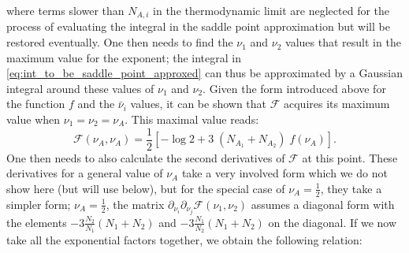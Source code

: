 \documentclass[aps,pra,reprint,superscriptaddress,twocolumn,notitlepage]{revtex4-1}
\numberwithin{equation}{section}
\begin{document}
where terms slower than $N_{A,i}$ in the thermodynamic limit are neglected for the process of evaluating the integral in the saddle point approximation but will be restored eventually.
One then needs to find the $\nu_1$ and $\nu_2$ values that result in the maximum value for the exponent; the integral in \eqref{eq:int_to_be_saddle_point_approxed} can thus be approximated by a Gaussian integral around these values of $\nu_1$ and $\nu_2$. Given the form introduced above for the function $f$ and the $\bar{\nu}_i$ values, it can be shown that $\mathcal{F}$ acquires its maximum value when $\nu_1 = \nu_2 = \nu_A$. This maximal value reads:
\begin{equation}
    \mathcal{F}(\nu_A, \nu_A) = \frac{1}{2} \left[ -\log 2 +  3 \; (N_{A_1}+N_{A_2}) \; f(\nu_A)    \right].
\end{equation}
One then needs to also calculate the second derivatives of $\mathcal{F}$ at this point. These derivatives for a general value of $\nu_A$ take a very involved form which we do not show here (but will use below), but for the special case of $\nu_A = \frac12$, they take a simpler form; $\nu_A = \frac12$, the matrix $\partial_{\nu_i} \partial_{\nu_j} \mathcal{F}(\nu_1, \nu_2)$ assumes a diagonal form with the elements $-3\frac{N_2}{N_1} (N_1+N_2)$ and $-3\frac{N_1}{N_2} (N_1+N_2)$ on the diagonal. If we now take all the exponential factors together, we obtain the following relation:
\end{document}
